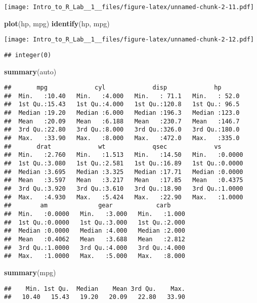 \documentclass[]{article}
\newenvironment{Shaded}{\begin{snugshade}}{\end{snugshade}}
\newcommand{\KeywordTok}[1]{\textcolor[rgb]{0.13,0.29,0.53}{\textbf{#1}}}
\newcommand{\NormalTok}[1]{#1}
\begin{document}
\texttt{[image: Intro\_to\_R\_Lab\_\_1\_\_files/figure-latex/unnamed-chunk-2-11.pdf]}

\begin{Shaded}
\begin{Highlighting}[]
\KeywordTok{plot}\NormalTok{(hp, mpg)}
\KeywordTok{identify}\NormalTok{(hp, mpg)}
\end{Highlighting}
\end{Shaded}

\texttt{[image: Intro\_to\_R\_Lab\_\_1\_\_files/figure-latex/unnamed-chunk-2-12.pdf]}

\begin{verbatim}
## integer(0)
\end{verbatim}

\begin{Shaded}
\begin{Highlighting}[]
\KeywordTok{summary}\NormalTok{(auto)}
\end{Highlighting}
\end{Shaded}

\begin{verbatim}
##       mpg             cyl             disp             hp       
##  Min.   :10.40   Min.   :4.000   Min.   : 71.1   Min.   : 52.0  
##  1st Qu.:15.43   1st Qu.:4.000   1st Qu.:120.8   1st Qu.: 96.5  
##  Median :19.20   Median :6.000   Median :196.3   Median :123.0  
##  Mean   :20.09   Mean   :6.188   Mean   :230.7   Mean   :146.7  
##  3rd Qu.:22.80   3rd Qu.:8.000   3rd Qu.:326.0   3rd Qu.:180.0  
##  Max.   :33.90   Max.   :8.000   Max.   :472.0   Max.   :335.0  
##       drat             wt             qsec             vs        
##  Min.   :2.760   Min.   :1.513   Min.   :14.50   Min.   :0.0000  
##  1st Qu.:3.080   1st Qu.:2.581   1st Qu.:16.89   1st Qu.:0.0000  
##  Median :3.695   Median :3.325   Median :17.71   Median :0.0000  
##  Mean   :3.597   Mean   :3.217   Mean   :17.85   Mean   :0.4375  
##  3rd Qu.:3.920   3rd Qu.:3.610   3rd Qu.:18.90   3rd Qu.:1.0000  
##  Max.   :4.930   Max.   :5.424   Max.   :22.90   Max.   :1.0000  
##        am              gear            carb      
##  Min.   :0.0000   Min.   :3.000   Min.   :1.000  
##  1st Qu.:0.0000   1st Qu.:3.000   1st Qu.:2.000  
##  Median :0.0000   Median :4.000   Median :2.000  
##  Mean   :0.4062   Mean   :3.688   Mean   :2.812  
##  3rd Qu.:1.0000   3rd Qu.:4.000   3rd Qu.:4.000  
##  Max.   :1.0000   Max.   :5.000   Max.   :8.000
\end{verbatim}

\begin{Shaded}
\begin{Highlighting}[]
\KeywordTok{summary}\NormalTok{(mpg)}
\end{Highlighting}
\end{Shaded}

\begin{verbatim}
##    Min. 1st Qu.  Median    Mean 3rd Qu.    Max. 
##   10.40   15.43   19.20   20.09   22.80   33.90
\end{verbatim}
\end{document}
